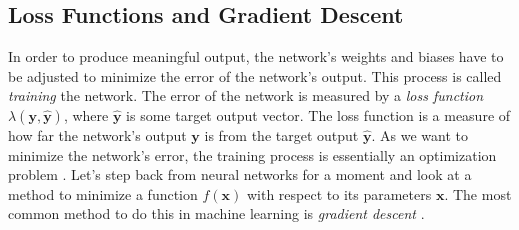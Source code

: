 \subsection{Loss Functions and Gradient Descent}
\label{subsec:loss-functions}
In order to produce meaningful output, the network's weights and biases have to be adjusted to minimize the error of the network's output.
This process is called \textit{training} the network.
The error of the network is measured by a \textit{loss function} $\lambda(\bm{y}, \bm{\hat{y}})$, where $\bm{\hat{y}}$ is some target output vector.
The loss function is a measure of how far the network's output $\bm{y}$ is from the target output $\bm{\hat{y}}$.
As we want to minimize the network's error, the training process is essentially an optimization problem \cite[chapter 4.3]{goodfellow_deep_2016}.
Let's step back from neural networks for a moment and look at a method to minimize a function $f(\bm{x})$ with respect to its parameters $\bm{x}$.
The most common method to do this in machine learning is \textit{gradient descent} \cite[chapter 4.3]{goodfellow_deep_2016}.
\\
\\
